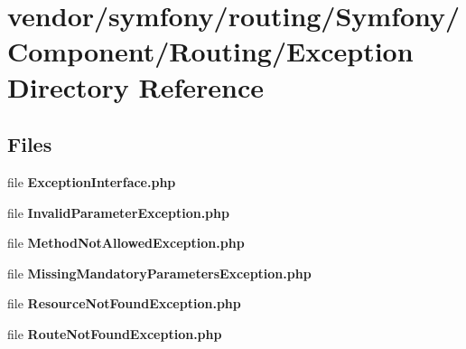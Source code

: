 \section{vendor/symfony/routing/\+Symfony/\+Component/\+Routing/\+Exception Directory Reference}
\label{dir_cd11e6fa6057ad546d363f0fc3c72436}
\subsection*{Files}
\begin{DoxyCompactItemize}
\item 
file {\bf Exception\+Interface.\+php}
\item 
file {\bf Invalid\+Parameter\+Exception.\+php}
\item 
file {\bf Method\+Not\+Allowed\+Exception.\+php}
\item 
file {\bf Missing\+Mandatory\+Parameters\+Exception.\+php}
\item 
file {\bf Resource\+Not\+Found\+Exception.\+php}
\item 
file {\bf Route\+Not\+Found\+Exception.\+php}
\end{DoxyCompactItemize}
